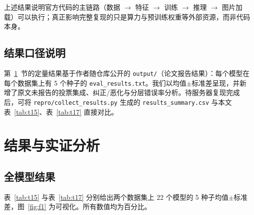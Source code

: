 \documentclass[11pt]{ctexart}
\begin{document}
上述结果说明官方代码的主链路（数据 $\rightarrow$ 特征 $\rightarrow$ 训练 $\rightarrow$ 推理 $\rightarrow$ 图片加载）可以执行；真正影响完整复现的只是算力与预训练权重等外部资源，而非代码本身。

\subsection{结果口径说明}

第~\ref{sec:results}~节的定量结果基于作者随仓库公开的 \texttt{output/}（论文报告结果）：每个模型在每个数据集上有 5 个种子的 \texttt{eval\_results.txt}。我们以均值$\pm$标准差呈现，并新增了原文未报告的投票集成、纠正/恶化与分层错误率分析。待服务器复现完成后，可将 \texttt{repro/collect\_results.py} 生成的 \texttt{results\_summary.csv} 与本文表~\ref{tab:t15}、表~\ref{tab:t17} 直接对比。

\section{结果与实证分析}\label{sec:results}

\subsection{全模型结果}

表~\ref{tab:t15} 与表~\ref{tab:t17} 分别给出两个数据集上 22 个模型的 5 种子均值$\pm$标准差，图~\ref{fig:f1} 为可视化。所有数值均为百分比。
\end{document}
